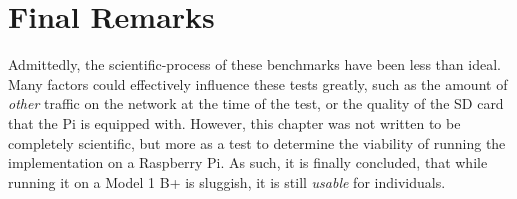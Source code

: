 	\section{Final Remarks}
		Admittedly, the scientific-process of these benchmarks have been less than ideal. Many factors could effectively influence these tests greatly, such as the amount of \emph{other} traffic on the network at the time of the test, or the quality of the SD card that the Pi is equipped with. However, this chapter was not written to be completely scientific, but more as a test to determine the viability of running the implementation on a Raspberry Pi. As such, it is finally concluded, that while running it on a Model 1 B+ is sluggish, it is still \emph{usable} for individuals.